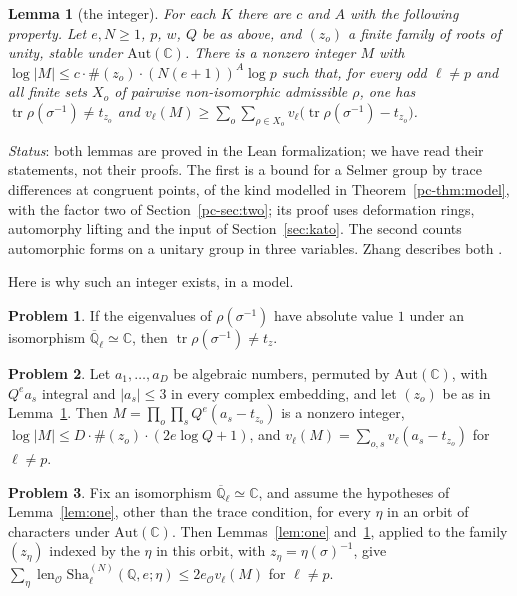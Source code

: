 \documentclass[reqno]{amsart}
\theoremstyle{definition}
\newtheorem{problem}{Problem}[section]
\theoremstyle{plain}
\newtheorem{lemma}[theorem]{Lemma}
\theoremstyle{remark}
\newcommand{\Q}{\mathbb{Q}}
\newcommand{\C}{\mathbb{C}}
\newcommand{\Qlb}{\overline{\Q}_\ell}
\newcommand{\Oc}{\mathcal{O}}
\newcommand{\tr}{\operatorname{tr}}
\newcommand{\len}{\operatorname{len}}
\newcommand{\Sha}{\mathrm{Sha}}
\begin{document}
\begin{lemma}[the integer]\label{lem:integer}
For each \(K\) there are \(c\) and \(A\) with the following property.  Let \(e,N\ge1\), \(p\), \(w\), \(Q\) be as above, and \((z_o)\) a finite family of roots of unity, stable under \(\mathrm{Aut}(\C)\).  There is a nonzero integer \(M\) with \(\log\lvert M\rvert\le c\cdot\#(z_o)\cdot(N(e+1))^A\log p\) such that, for every odd \(\ell\ne p\) and all finite sets \(X_o\) of pairwise non-isomorphic admissible \(\rho\), one has \(\tr\rho(\sigma^{-1})\ne t_{z_o}\) and \(v_\ell(M)\ge\sum_o\sum_{\rho\in X_o}v_\ell\bigl(\tr\rho(\sigma^{-1})-t_{z_o}\bigr)\).
\end{lemma}

\noindent\emph{Status}: both lemmas are proved in the Lean formalization; we have read their statements, not their proofs.  The first is a bound for a Selmer group by trace differences at congruent points, of the kind modelled in Theorem~\ref{pc-thm:model}, with the factor two of Section~\ref{pc-sec:two}; its proof uses deformation rings, automorphy lifting and the input of Section~\ref{sec:kato}.  The second counts automorphic forms on a unitary group in three variables.  Zhang describes both \cite[\S5.4]{Zh}.

Here is why such an integer exists, in a model.

\begin{problem}\label{pr:purity}
If the eigenvalues of \(\rho(\sigma^{-1})\) have absolute value \(1\) under an isomorphism \(\Qlb\simeq\C\), then \(\tr\rho(\sigma^{-1})\ne t_z\).
\end{problem}

\begin{problem}\label{pr:M-model}
Let \(a_1,\dots,a_D\) be algebraic numbers, permuted by \(\mathrm{Aut}(\C)\), with \(Q^ea_s\) integral and \(\lvert a_s\rvert\le3\) in every complex embedding, and let \((z_o)\) be as in Lemma~\ref{lem:integer}.  Then \(M=\prod_o\prod_sQ^e(a_s-t_{z_o})\) is a nonzero integer, \(\log\lvert M\rvert\le D\cdot\#(z_o)\cdot(2e\log Q+1)\), and \(v_\ell(M)=\sum_{o,s}v_\ell(a_s-t_{z_o})\) for \(\ell\ne p\).
\end{problem}

\begin{problem}\label{pr:orbit}
Fix an isomorphism \(\Qlb\simeq\C\), and assume the hypotheses of Lemma~\ref{lem:one}, other than the trace condition, for every \(\eta\) in an orbit of characters under \(\mathrm{Aut}(\C)\).  Then Lemmas~\ref{lem:one} and~\ref{lem:integer}, applied to the family \((z_\eta)\) indexed by the \(\eta\) in this orbit, with \(z_\eta=\eta(\sigma)^{-1}\), give \(\sum_\eta\len_\Oc\Sha^{(N)}_\ell(\Q,e;\eta)\le2e_\Oc v_\ell(M)\) for \(\ell\ne p\).
\end{problem}
\end{document}
